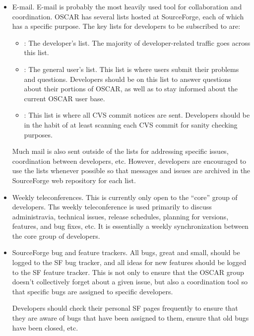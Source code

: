 \begin{itemize}
\item E-mail.  E-mail is probably the most heavily used tool for
  collaboration and coordination.  OSCAR has several lists hosted at
  SourceForge, each of which has a specific purpose.  The key lists
  for developers to be subscribed to are:

  \begin{itemize}
  \item {}: The developer's list.  The majority of
    developer-related traffic goes across this list.
    
  \item {}: The general user's list.  This list is
    where users submit their problems and questions.  Developers
    should be on this list to answer questions about their portions of
    OSCAR, as well as to stay informed about the current OSCAR user
    base.
    
  \item {}: This list is where all CVS commit
    notices are sent.  Developers should be in the habit of at least
    scanning each CVS commit for sanity checking purposes.
  \end{itemize}
  
  Much mail is also sent outside of the lists for addressing specific
  issues, coordination between developers, etc.  However, developers
  are encouraged to use the lists whenever possible so that messages
  and issues are archived in the SourceForge web repository for each
  list.
  
\item Weekly teleconferences.  This is currently only open to the
  ``core'' group of developers.  Ths weekly teleconference is used
  primarily to discuss administravia, technical issues, release
  schedules, planning for versions, features, and bug fixes, etc.  It
  is essentially a weekly synchronization between the core group of
  developers.

\item SourceForge bug and feature trackers.  All bugs, great and
  small, should be logged to the SF bug tracker, and all ideas for new
  features should be logged to the SF feature tracker.  This is not
  only to ensure that the OSCAR group doesn't collectively forget
  about a given issue, but also a coordination tool so that specific
  bugs are assigned to specific developers.
  
  Developers should check their personal SF pages frequently to ensure
  that they are aware of bugs that have been assigned to them, ensure
  that old bugs have been closed, etc.
  

\end{itemize}

